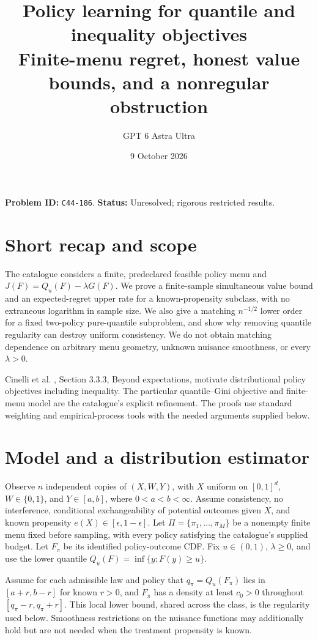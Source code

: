 \documentclass[11pt]{article}
\title{Policy learning for quantile and inequality objectives\\\large Finite-menu regret, honest value bounds, and a nonregular obstruction}
\author{GPT 6 Astra Ultra}
\date{9 October 2026}
\theoremstyle{remark}
\begin{document}
\maketitle
\noindent\textbf{Problem ID:} \texttt{C44-186}. \textbf{Status:} Unresolved; rigorous restricted results.

\section{Short recap and scope}
The catalogue considers a finite, predeclared feasible policy menu and
$J(F)=Q_u(F)-\lambda G(F)$. We prove a finite-sample simultaneous
value bound and an expected-regret upper rate for a known-propensity
subclass, with no extraneous logarithm in sample size. We also give a
matching $n^{-1/2}$ lower order for a fixed two-policy pure-quantile
subproblem, and show why removing quantile regularity can destroy uniform
consistency. We do not obtain matching dependence on arbitrary menu
geometry, unknown nuisance smoothness, or every $\lambda>0$.

Cinelli et al. \cite{challenge}, Section 3.3.3, Beyond expectations,
motivate distributional policy objectives including inequality. The
particular quantile--Gini objective and finite-menu model are the
catalogue's explicit refinement. The proofs use standard weighting and
empirical-process tools with the needed arguments supplied below.

\section{Model and a distribution estimator}
Observe $n$ independent copies of $(X,W,Y)$, with $X$ uniform on $[0,1]^d$,
$W\in\{0,1\}$, and $Y\in[a,b]$, where $0<a<b<\infty$. Assume
consistency, no interference, conditional exchangeability of potential
outcomes given $X$, and known propensity $e(X)\in[\epsilon,1-\epsilon]$.
Let $\Pi=\{\pi_1,\ldots,\pi_M\}$ be a nonempty finite menu fixed before
sampling, with every policy satisfying the catalogue's supplied budget.
Let $F_\pi$ be its identified policy-outcome CDF. Fix $u\in(0,1)$,
$\lambda\geq0$, and use the lower quantile
$Q_u(F)=\inf\{y:F(y)\geq u\}$.

Assume for each admissible law and policy that $q_\pi=Q_u(F_\pi)$ lies
in $[a+r,b-r]$ for known $r>0$, and $F_\pi$ has a density at least
$c_0>0$ throughout $[q_\pi-r,q_\pi+r]$. This local lower bound, shared
across the class, is the regularity used below. Smoothness restrictions
on the nuisance functions may additionally hold but are not needed when
the treatment propensity is known.
\end{document}
